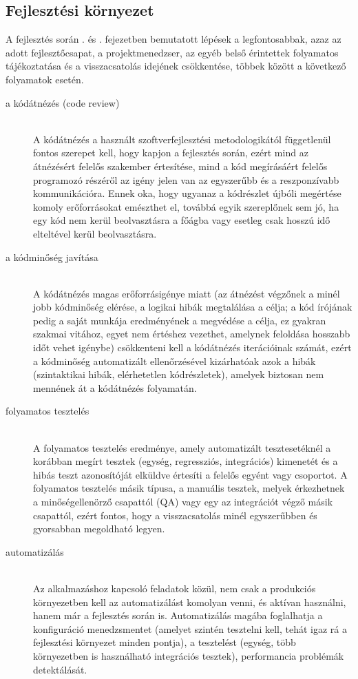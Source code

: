 \subsection*{Fejlesztési környezet}
A fejlesztés során . és . fejezetben bemutatott lépések a legfontosabbak, azaz az adott fejlesztőcsapat, a projektmenedzser, az egyéb belső érintettek folyamatos tájékoztatása és a visszacsatolás idejének csökkentése, többek között a következő folyamatok esetén.
\begin{description}
  \item[a kódátnézés (code review)]\hfill\\
  A kódátnézés a használt szoftverfejlesztési metodologikától függetlenül fontos szerepet kell, hogy kapjon a fejlesztés során, ezért mind az átnézésért felelős szakember értesítése, mind a kód megírásáért felelős programozó részéről az igény jelen van az egyszerűbb és a reszponzívabb kommunikációra. Ennek oka, hogy ugyanaz a kódrészlet újbóli megértése komoly erőforrásokat emészthet el, továbbá egyik szereplőnek sem jó, ha egy kód nem kerül beolvasztásra a főágba vagy esetleg csak hosszú idő elteltével kerül beolvasztásra.
  \item[a kódminőség javítása]\hfill\\
  A kódátnézés magas erőforrásigénye miatt (az átnézést végzőnek a minél jobb kódminőség elérése, a logikai hibák megtalálása a célja; a kód írójának pedig a saját munkája eredményének a megvédése a célja, ez gyakran szakmai vitához, egyet nem értéshez vezethet, amelynek feloldása hosszabb időt vehet igénybe) csökkenteni kell a kódátnézés iterációinak számát, ezért a kódminőség automatizált ellenőrzésével kizárhatóak azok a hibák (szintaktikai hibák, elérhetetlen kódrészletek), amelyek biztosan nem mennének át a kódátnézés folyamatán.
  \item[folyamatos tesztelés]\hfill\\
  A folyamatos tesztelés eredménye, amely automatizált tesztesetéknél a korábban megírt tesztek (egység, regressziós, integrációs) kimenetét és a hibás teszt azonosítóját elküldve értesíti a felelős egyént vagy csoportot. A folyamatos tesztelés másik típusa, a manuális tesztek, melyek érkezhetnek a minőségellenörző csapattól (QA) vagy egy az integrációt végző másik csapattól, ezért fontos, hogy a visszacsatolás minél egyszerűbben és gyorsabban megoldható legyen.
  \item[automatizálás]\hfill\\
  Az alkalmazáshoz kapcsoló feladatok közül, nem csak a produkciós környezetben kell az automatizálást komolyan venni, és aktívan használni, hanem már a fejlesztés során is. Automatizálás magába foglalhatja a konfiguráció menedzsmentet (amelyet szintén tesztelni kell, tehát igaz rá a fejlesztési környezet minden pontja), a tesztelést (egység, több környezetben is használható integrációs tesztek), performancia problémák detektálását.
\end{description}

